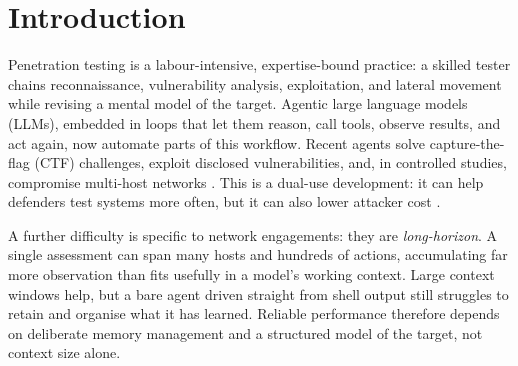 \documentclass[12pt,oneside]{report}
\date{May 2026}
\begin{document}



\clearpage{\pagestyle{empty}\cleardoublepage}
\setcounter{page}{1}
\pagestyle{fancy}


\tableofcontents


\clearpage{\pagestyle{empty}\cleardoublepage}
\setcounter{page}{1}
\fancyhead[LE,RO]{\slshape \rightmark}
\fancyhead[LO,RE]{\slshape \leftmark}

\chapter{Introduction}
\label{ch:introduction}

Penetration testing is a labour-intensive, expertise-bound practice: a skilled
tester chains reconnaissance, vulnerability analysis, exploitation, and lateral
movement while revising a mental model of the target. Agentic large language
models (LLMs), embedded in loops that let them reason, call tools, observe
results, and act again, now automate parts of this workflow. Recent agents solve
capture-the-flag (CTF) challenges, exploit disclosed vulnerabilities, and, in
controlled studies, compromise multi-host networks \citep{deng2023pentestgpt,
    fang2024oneday, singer2025incalmo}. This is a dual-use development: it can
help defenders test systems more often, but it can also lower attacker cost
\citep{xu2025survey}.

A further difficulty is specific to network engagements: they are
\emph{long-horizon}. A single assessment can span many hosts and hundreds of
actions, accumulating far more observation than fits usefully in a model's
working context. Large context windows help, but a bare agent driven straight
from shell output still struggles to retain and organise what it has learned.
Reliable performance therefore depends on deliberate memory management and a
structured model of the target, not context size alone.
\end{document}

